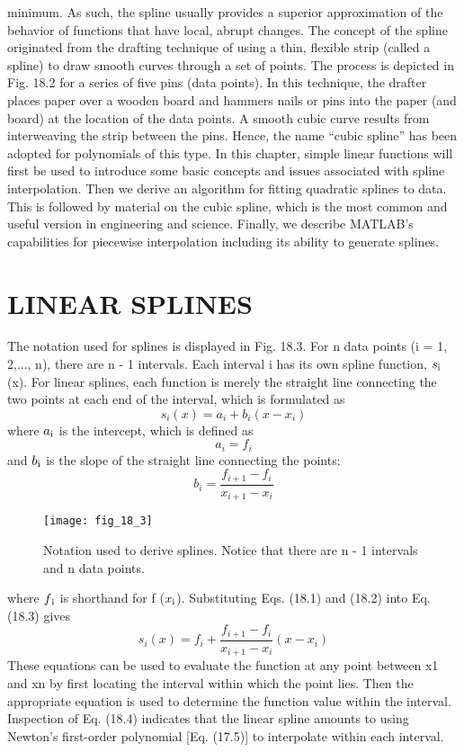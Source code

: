 \documentclass[../main.tex]{subfiles}
\begin{document}
minimum. As such, the spline usually provides a superior approximation of the behavior of
functions that have local, abrupt changes.
The concept of the spline originated from the drafting technique of using a thin, flexible strip (called a spline) to draw smooth curves through a set of points. The process is depicted in Fig. 18.2 for a series of five pins (data points). In this technique, the drafter places
paper over a wooden board and hammers nails or pins into the paper (and board) at the location of the data points. A smooth cubic curve results from interweaving the strip between
the pins. Hence, the name “cubic spline” has been adopted for polynomials of this type.
In this chapter, simple linear functions will first be used to introduce some basic concepts and issues associated with spline interpolation. Then we derive an algorithm for fitting
quadratic splines to data. This is followed by material on the cubic spline, which is the most
common and useful version in engineering and science. Finally, we describe MATLAB's
capabilities for piecewise interpolation including its ability to generate splines.
\section{LINEAR SPLINES}
The notation used for splines is displayed in Fig. 18.3. For n data points (i = 1, 2,..., n),
there are n - 1 intervals. Each interval i has its own spline function, $s\textsubscript{i}$(x). For linear
splines, each function is merely the straight line connecting the two points at each end of
the interval, which is formulated as
\begin{equation}
    \tag{18.1}
    s_{i}(x)=a_{i}+b_{i}\left(x-x_{i}\right)
\end{equation}
where $a\textsubscript{i}$ is the intercept, which is defined as
\begin{equation}
    \tag{18.2}
    a_{i}=f_{i}
\end{equation}
and $b\textsubscript{i}$ is the slope of the straight line connecting the points:
\begin{equation}
    b_{i}=\frac{f_{i+1}-f_{i}}{x_{i+1}-x_{i}}
    \tag{18.3}
    \end{equation}
    \begin{figure}[H]
        \centering
        \texttt{[image: fig\_18\_3]}
       \caption{\textsf{Notation used to derive splines. Notice that there are n - 1 intervals and n data points.}}\label{fig:fig_18_3}
    \end{figure}
    where $f\textsubscript{i}$ is shorthand for f ($x\textsubscript{i}$). Substituting Eqs. (18.1) and (18.2) into Eq. (18.3) gives
    \begin{equation}
        s_{i}(x)=f_{i}+\frac{f_{i+1}-f_{i}}{x_{i+1}-x_{i}}\left(x-x_{i}\right)
        \tag{18.4}
    \end{equation}
    These equations can be used to evaluate the function at any point between x1 and xn
by first locating the interval within which the point lies. Then the appropriate equation is
used to determine the function value within the interval. Inspection of Eq. (18.4) indicates
that the linear spline amounts to using Newton's first-order polynomial [Eq. (17.5)] to
interpolate within each interval.
\end{document}
